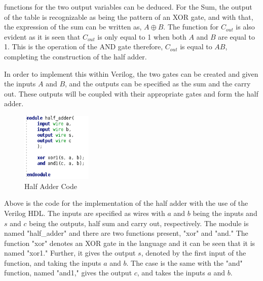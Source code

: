 \documentclass[12pt]{article}
\begin{document}
    functions for the two output variables can be deduced. For the Sum, the
    output of the table is recognizable as being the pattern of an XOR gate, and
    with that, the expression of the sum can be written as, $A \oplus B$. The
    function for $C_{out}$ is also evident as it is seen that $C_{out}$ is only
    equal to 1 when both $A$ and $B$ are equal to 1. This is the operation of
    the AND gate therefore, $C_{out}$ is equal to $AB$, completing the
    construction of the half adder.
    \par In order to implement this within Verilog, the two gates can be created
    and given the inputs $A$ and $B$, and the outputs can be specified as the
    sum and the carry out. These outputs will be coupled with their appropriate
    gates and form the half adder.
    \begin{figure}[h]
        \centering
        \includegraphics[width=0.3\textwidth]{Half Adder Code.png}
        \caption{Half Adder Code}
        \label{fig:Half-Adder-Code}
    \end{figure}
    \par Above is the code for the implementation of the half adder with the use
    of the Verilog HDL. The inputs are specified as wires with $a$ and $b$ being
    the inputs and $s$ and $c$ being the outputs, half sum and carry out,
    respectively. The module is named "half\_adder" and there are two functions
    present, "xor" and "and." The function "xor" denotes an XOR gate in the
    language and it can be seen that it is named "xor1." Further, it gives the
    output $s$, denoted by the first input of the function, and taking the
    inputs $a$ and $b$. The case is the same with the "and" function, named
    "and1," gives the output $c$, and takes the inputs $a$ and $b$.
\end{document}
